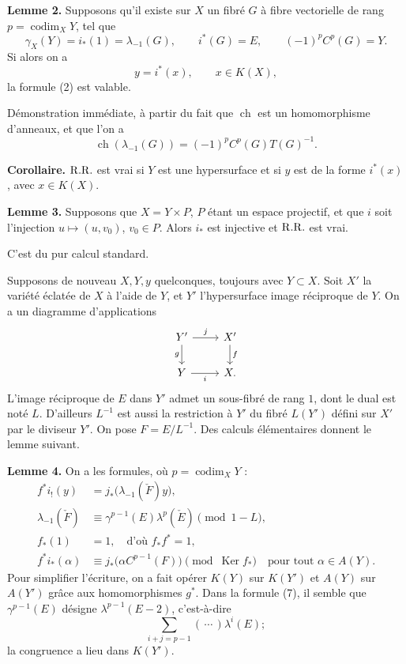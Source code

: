 \documentclass[11pt]{article}
\newcommand{\ch}{\operatorname{ch}}
\providecommand{\codim}{\operatorname{codim}}
\providecommand{\ch}{\operatorname{ch}}
\providecommand{\Ker}{\operatorname{Ker}}
\providecommand{\codim}{\operatorname{codim}}
\begin{document}
\textbf{Lemme 2.} Supposons qu'il existe sur \(X\) un fibré \(G\) à fibre vectorielle de rang \(p=\codim_XY\), tel que
\begin{equation}\tag{3}
  \gamma_X(Y)=i_*(1)=\lambda_{-1}(G),\qquad
  i^*(G)=E,\qquad
  (-1)^pC^p(G)=Y.
\end{equation}
Si alors on a
\begin{equation}\tag{4}
  y=i^*(x),\qquad x\in K(X),
\end{equation}
la formule (2) est valable.

Démonstration immédiate, à partir du fait que \(\ch\) est un homomorphisme d'anneaux, et que l'on a
\begin{equation}\tag{5}
  \ch(\lambda_{-1}(G))=(-1)^pC^p(G)T(G)^{-1}.
\end{equation}

\textbf{Corollaire.} \(\mathrm{R.R.}\) est vrai si \(Y\) est une hypersurface et si \(y\) est de la forme \(i^*(x)\), avec \(x\in K(X)\).

\textbf{Lemme 3.} Supposons que \(X=Y\times P\), \(P\) étant un espace projectif, et que \(i\) soit l'injection \(u\mapsto (u,v_0)\), \(v_0\in P\). Alors \(i_*\) est injective et \(\mathrm{R.R.}\) est vrai.

C'est du pur calcul standard.

Supposons de nouveau \(X,Y,y\) quelconques, toujours avec \(Y\subset X\). Soit \(X'\) la variété éclatée de \(X\) à l'aide de \(Y\), et \(Y'\) l'hypersurface image réciproque de \(Y\). On a un diagramme d'applications
\[
\begin{tikzcd}
Y' \arrow[r,"j"] \arrow[d,"g"'] & X' \arrow[d,"f"]\\
Y \arrow[r,"i"'] & X .
\end{tikzcd}
\]
L'image réciproque de \(E\) dans \(Y'\) admet un sous-fibré de rang \(1\), dont le dual est noté \(L\). D'ailleurs \(L^{-1}\) est aussi la restriction à \(Y'\) du fibré \(L(Y')\) défini sur \(X'\) par le diviseur \(Y'\). On pose \(F=E/L^{-1}\). Des calculs élémentaires donnent le lemme suivant.

\textbf{Lemme 4.} On a les formules, où \(p=\codim_XY\) :
\begin{align}
  f^*i_!(y)&=j_*\bigl(\lambda_{-1}(\check F)y\bigr), \tag{6}\\
  \lambda_{-1}(\check F)&\equiv \gamma^{p-1}(E)\lambda^p(\check E)
    \pmod{1-L}, \tag{7}\\
  f_*(1)&=1,\quad\text{d'où }f_*f^*=1, \tag{8}\\
  f^*i_*(\alpha)&\equiv j_*\bigl(\alpha C^{p-1}(F)\bigr)
    \pmod{\Ker f_*}\quad\text{pour tout }\alpha\in A(Y). \tag{9}
\end{align}
Pour simplifier l'écriture, on a fait opérer \(K(Y)\) sur \(K(Y')\) et \(A(Y)\) sur \(A(Y')\) grâce aux homomorphismes \(g^*\). Dans la formule (7), il semble que \(\gamma^{p-1}(E)\) désigne \(\lambda^{p-1}(E-2)\), c'est-à-dire
\[
  \sum_{i+j=p-1}(\,\cdots\,)\lambda^i(E);
\]
la congruence a lieu dans \(K(Y')\).
\end{document}
